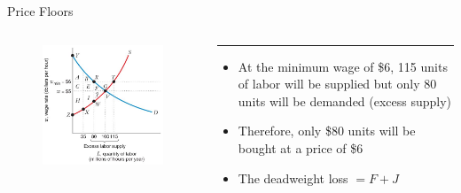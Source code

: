 \documentclass[11pt,t]{beamer}
\begin{document}
\begin{frame}{Price Floors}
  \begin{columns}[T]
    \vspace{0pt}
    \begin{column}{.55\textwidth}
      \begin{figure}
        \includegraphics[width=\textwidth]{figures/fig10_10a.jpg}
      \end{figure}

      \vspace*{50mm} %
    \end{column}
    
    \hfill
    
    \begin{column}{.45\textwidth}
      {\color{accent}\rule{\linewidth}{2pt}}

      \begin{itemize}
        \item At the minimum wage of \$6, 115 units of labor will be supplied but only 80 units will be demanded (excess supply)
        
        \item Therefore, only \$80 units will be bought at a price of \$6

        \item The deadweight loss $= F + J$
      \end{itemize}
    \end{column}
  \end{columns}
\end{frame}
\end{document}
